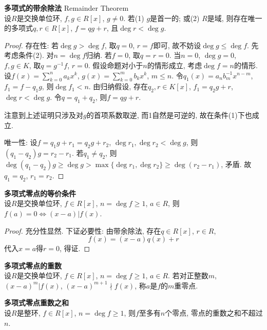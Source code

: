 \begin{pro} \textbf{多项式的带余除法} Remainder Theorem\\
设$R$是交换单位环, $f,g \in R[x]$, $g\neq 0$. 若(1) $g$是首一的; 或(2) $R$是域, 则存在唯一的多项式$q,r \in R[x]$, $f=qg+r$, 且$\deg r < \deg g$.  
\end{pro}
\begin{proof}
\par 存在性: 若$\deg g>\deg f$, 取$q=0$, $r=f$即可, 故不妨设$\deg g\le \deg f$. 先考虑条件(2). 对$n=\deg f$归纳. 若$f=0$, 取$q=r=0$. 当$n=0$, $\deg g=0$, $f,g\in K$, 取$q=g^{-1}f$, $r=0$. 假设命题对小于$n$的情形成立, 考虑$\deg f=n$的情形. 设$f(x)=\sum_{k=0}^n a_k x^k$, $g(x)=\sum_{k=0}^m b_k x^k$, $m\le n$. 令$q_1(x) = a_nb_m^{-1} x^{n-m}$, $f_1=f-q_1g$, 则$\deg f_1 < n$. 由归纳假设, 存在$q_2,r\in K[x]$, $f_1=q_2g+r$, $\deg r<\deg g$. 令$q=q_1+q_2$, 则$f=qg+r$. 
\par 注意到上述证明只涉及对$g$的首项系数取逆, 而1自然是可逆的, 故在条件(1)下也成立. 

\par 唯一性: 设$f=q_1g+r_1=q_2g+r_2$, $\deg r_1, \deg r_2 < \deg g$, 则$(q_1-q_2)g=r_2-r_1$. 若$q_1\neq q_2$, 则$\deg (q_1-q_2)g \ge \deg g > \max \{\deg r_1, \deg r_2\} \ge \deg (r_2-r_1)$, 矛盾. 故$q_1=q_2$, $r_1=r_2$.
\end{proof}

\begin{col} \textbf{多项式零点的等价条件}\\
设$R$是交换单位环, $f\in R[x]$, $n=\deg f \ge 1$, $a\in R$, 则$f(a)=0 \iff (x-a) | f(x)$. 
\end{col}
\begin{proof}
充分性显然. 下证必要性: 由带余除法, 存在$q\in R[x]$, $r\in R$, 
\begin{equation}
    f(x)=(x-a)q(x)+r
\end{equation}
代入$x=a$得$r=0$, 得证. 
\end{proof}

\begin{dfn}\textbf{多项式零点的重数}\\
设$R$是交换单位环, $f\in R[x]$, $n=\deg f \ge 1$, $a\in R$. 若对正整数$m$, $(x-a)^m|f(x)$, $(x-a)^{m+1}\nmid f(x)$, 称$a$是$f$的$m$重零点. 
\end{dfn}

\begin{pro}\textbf{多项式零点重数之和}\\
设$R$是整环, $f\in R[x]$, $n=\deg f \ge 1$, 则$f$至多有$n$个零点, 零点的重数之和不超过$n$. 
\end{pro}

